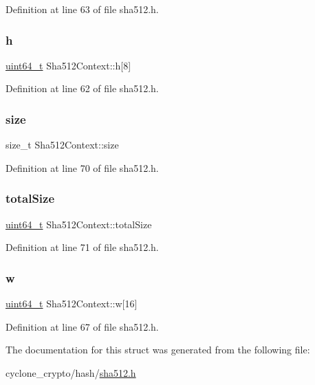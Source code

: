 Definition at line 63 of file sha512.\+h.

\mbox{\label{structSha512Context_ad45c82baa9d7bc67dccdab829d8c2586}} 
\subsubsection{\texorpdfstring{h}{h}}
{\footnotesize\ttfamily \hyperlink{stdint_8h_aec6fcb673ff035718c238c8c9d544c47}{uint64\+\_\+t} Sha512\+Context\+::h\mbox{[}8\mbox{]}}



Definition at line 62 of file sha512.\+h.

\mbox{\label{structSha512Context_ac9959286ecbbbe3fc89c954f65e3add2}} 
\subsubsection{\texorpdfstring{size}{size}}
{\footnotesize\ttfamily size\+\_\+t Sha512\+Context\+::size}



Definition at line 70 of file sha512.\+h.

\mbox{\label{structSha512Context_a5fc83aae6c94e47daba93aa778cb952d}} 
\subsubsection{\texorpdfstring{total\+Size}{totalSize}}
{\footnotesize\ttfamily \hyperlink{stdint_8h_aec6fcb673ff035718c238c8c9d544c47}{uint64\+\_\+t} Sha512\+Context\+::total\+Size}



Definition at line 71 of file sha512.\+h.

\mbox{\label{structSha512Context_ae359d0bf9be744a30222e2086ca42860}} 
\subsubsection{\texorpdfstring{w}{w}}
{\footnotesize\ttfamily \hyperlink{stdint_8h_aec6fcb673ff035718c238c8c9d544c47}{uint64\+\_\+t} Sha512\+Context\+::w\mbox{[}16\mbox{]}}



Definition at line 67 of file sha512.\+h.



The documentation for this struct was generated from the following file\+:\begin{DoxyCompactItemize}
\item 
cyclone\+\_\+crypto/hash/\hyperlink{sha512_8h}{sha512.\+h}\end{DoxyCompactItemize}
